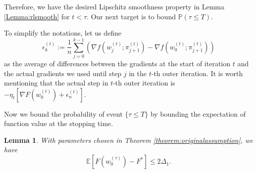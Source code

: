 \documentclass{article} %
\theoremstyle{plain}
\newtheorem{Lemma}[theorem]{Lemma}
\theoremstyle{definition}
\theoremstyle{remark}
\begin{document}

Therefore, we have the desired Lipschitz smoothness property in Lemma \ref{Lemma:rlsmooth} for $t<\tau$. Our next target is to bound $\mathbb{P}(\tau\leq T).$

To simplify the notations, let us define
$$\epsilon^{(t)}_k:=\frac{1}{n}\sum_{j=0}^{k-1}(\nabla f(w^{(t)}_j;\pi^{(t)}_{j+1})-\nabla f(w^{(t)}_0;\pi^{(t)}_{j+1}))$$ as the average of differences between the gradients at the start of iteration $t$ and the actual gradients we used until step $j$ in the $t$-th outer iteration. It is worth mentioning that the actual step in $t$-th outer iteration is $-\eta_t[\nabla F(w^{(t)}_0)+\epsilon^{(t)}_n]$.

Now we bound the probability of event $\{\tau\leq T\}$ by bounding the expectation of function value at the stopping time.

\begin{Lemma}
\label{Lemma:Ftau}
    With parameters chosen in Theorem \ref{theorem:originalassumption}, we have $$\mathbb{E}[F(w^{(\tau)}_0)-F^*]\leq 2\Delta_1.$$
\end{Lemma}
\end{document}
